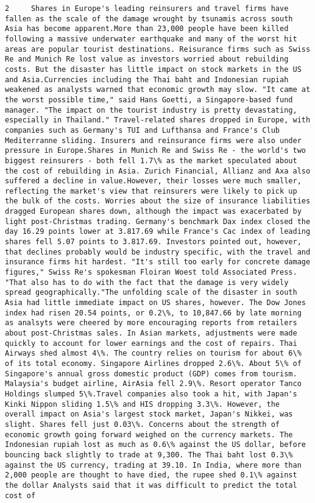 \documentclass[11pt]{article}
\begin{document}
\begin{Verbatim}[commandchars=\\\{\}]
         2     Shares in Europe's leading reinsurers and travel firms have fallen as the scale of the damage wrought by tsunamis across south Asia has become apparent.More than 23,000 people have been killed following a massive underwater earthquake and many of the worst hit areas are popular tourist destinations. Reisurance firms such as Swiss Re and Munich Re lost value as investors worried about rebuilding costs. But the disaster has little impact on stock markets in the US and Asia.Currencies including the Thai baht and Indonesian rupiah weakened as analysts warned that economic growth may slow. "It came at the worst possible time," said Hans Goetti, a Singapore-based fund manager. "The impact on the tourist industry is pretty devastating, especially in Thailand." Travel-related shares dropped in Europe, with companies such as Germany's TUI and Lufthansa and France's Club Mediterranne sliding. Insurers and reinsurance firms were also under pressure in Europe.Shares in Munich Re and Swiss Re - the world's two biggest reinsurers - both fell 1.7\% as the market speculated about the cost of rebuilding in Asia. Zurich Financial, Allianz and Axa also suffered a decline in value.However, their losses were much smaller, reflecting the market's view that reinsurers were likely to pick up the bulk of the costs. Worries about the size of insurance liabilities dragged European shares down, although the impact was exacerbated by light post-Christmas trading. Germany's benchmark Dax index closed the day 16.29 points lower at 3.817.69 while France's Cac index of leading shares fell 5.07 points to 3.817.69. Investors pointed out, however, that declines probably would be industry specific, with the travel and insurance firms hit hardest. "It's still too early for concrete damage figures," Swiss Re's spokesman Floiran Woest told Associated Press. "That also has to do with the fact that the damage is very widely spread geographically."The unfolding scale of the disaster in south Asia had little immediate impact on US shares, however. The Dow Jones index had risen 20.54 points, or 0.2\%, to 10,847.66 by late morning as analsyts were cheered by more encouraging reports from retailers about post-Christmas sales. In Asian markets, adjustments were made quickly to account for lower earnings and the cost of repairs. Thai Airways shed almost 4\%. The country relies on tourism for about 6\% of its total economy. Singapore Airlines dropped 2.6\%. About 5\% of Singapore's annual gross domestic product (GDP) comes from tourism. Malaysia's budget airline, AirAsia fell 2.9\%. Resort operator Tanco Holdings slumped 5\%.Travel companies also took a hit, with Japan's Kinki Nippon sliding 1.5\% and HIS dropping 3.3\%. However, the overall impact on Asia's largest stock market, Japan's Nikkei, was slight. Shares fell just 0.03\%. Concerns about the strength of economic growth going forward weighed on the currency markets. The Indonesian rupiah lost as much as 0.6\% against the US dollar, before bouncing back slightly to trade at 9,300. The Thai baht lost 0.3\% against the US currency, trading at 39.10. In India, where more than 2,000 people are thought to have died, the rupee shed 0.1\% against the dollar Analysts said that it was difficult to predict the total cost of 
\end{Verbatim}
\end{document}

